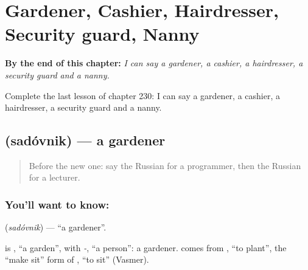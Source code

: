 
\chapter{Gardener, Cashier, Hairdresser, Security guard, Nanny}
\label{ch:ru-gardener-cashier-hairdresser-security-guard-nanny}

\begin{chapteropening}
\textbf{By the end of this chapter:} \emph{I can say a gardener, a cashier, a hairdresser, a security guard and a nanny.}

Complete the last lesson of chapter 230: I can say a gardener, a cashier, a hairdresser, a security guard and a nanny.
\end{chapteropening}

\section[\texorpdfstring{\ru{садовник} (sadóvnik)}{садовник (sadóvnik)}]{ (sadóvnik) — a gardener}

\label{lesson:RU-C230-sadovnik}



\begin{quote}
Before the new one: say the Russian for a programmer, then the Russian for a lecturer.
\end{quote}

\subsection*{You'll want to know: }
\textbf{} (\emph{sadóvnik}) — \textquotedblleft{}a gardener\textquotedblright{}.

\begin{cousinweb}
\textbf{} is \emph{}, \textquotedblleft{}a garden\textquotedblright{}, with \emph{-}, \textquotedblleft{}a person\textquotedblright{}: a gardener. \emph{} comes from \emph{}, \textquotedblleft{}to plant\textquotedblright{}, the \textquotedblleft{}make sit\textquotedblright{} form of \emph{}, \textquotedblleft{}to sit\textquotedblright{} (Vasmer).
\end{cousinweb}

